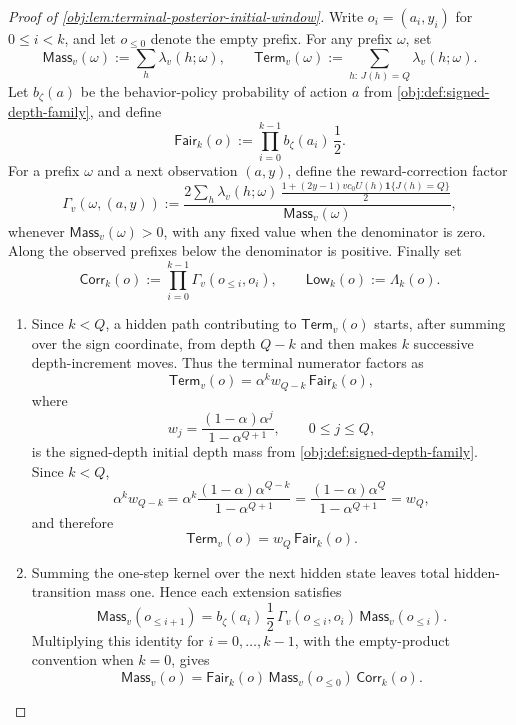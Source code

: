 \begin{proof}[Proof of \cref{obj:lem:terminal-posterior-initial-window}]
Write \(o_i=(a_i,y_i)\) for \(0\le i<k\), and let \(o_{\le 0}\) denote the empty prefix.  For any prefix \(\omega\), set
\[
\mathsf{Mass}_v(\omega):=\sum_h \lambda_v(h;\omega),
\qquad
\mathsf{Term}_v(\omega):=\sum_{h:\,J(h)=Q}\lambda_v(h;\omega).
\]
Let \(b_\zeta(a)\) be the behavior-policy probability of action \(a\) from \cref{obj:def:signed-depth-family}, and define
\[
\mathsf{Fair}_k(o)
:=
\prod_{i=0}^{k-1} b_\zeta(a_i)\,\frac12 .
\]
For a prefix \(\omega\) and a next observation \((a,y)\), define the reward-correction factor
\[
\Gamma_v(\omega,(a,y))
:=
\frac{
  2\sum_h \lambda_v(h;\omega)\,
  \frac{1+(2y-1)v c_0 U(h)\mathbf 1\{J(h)=Q\}}{2}
}{
  \mathsf{Mass}_v(\omega)
},
\]
whenever \(\mathsf{Mass}_v(\omega)>0\), with any fixed value when the denominator is zero.  Along the observed prefixes below the denominator is positive.  Finally set
\[
\mathsf{Corr}_k(o):=\prod_{i=0}^{k-1}\Gamma_v(o_{\le i},o_i),
\qquad
\mathsf{Low}_k(o):=\Lambda_k(o).
\]

\begin{enumerate}
\item Since \(k<Q\), a hidden path contributing to \(\mathsf{Term}_v(o)\) starts, after summing over the sign coordinate, from depth \(Q-k\) and then makes \(k\) successive depth-increment moves.  Thus the terminal numerator factors as
\[
\mathsf{Term}_v(o)
=
\alpha^k w_{Q-k}\,\mathsf{Fair}_k(o),
\]
where
\[
w_j=\frac{(1-\alpha)\alpha^j}{1-\alpha^{Q+1}},
\qquad 0\le j\le Q,
\]
is the signed-depth initial depth mass from \cref{obj:def:signed-depth-family}.  Since \(k<Q\),
\[
\alpha^k w_{Q-k}
=
\alpha^k\frac{(1-\alpha)\alpha^{Q-k}}{1-\alpha^{Q+1}}
=
\frac{(1-\alpha)\alpha^Q}{1-\alpha^{Q+1}}
=
w_Q,
\]
and therefore
\[
\mathsf{Term}_v(o)=w_Q\,\mathsf{Fair}_k(o).
\]

\item Summing the one-step kernel over the next hidden state leaves total hidden-transition mass one.  Hence each extension satisfies
\[
\mathsf{Mass}_v(o_{\le i+1})
=
b_\zeta(a_i)\,\frac12\,
\Gamma_v(o_{\le i},o_i)\,
\mathsf{Mass}_v(o_{\le i}).
\]
Multiplying this identity for \(i=0,\ldots,k-1\), with the empty-product convention when \(k=0\), gives
\[
\mathsf{Mass}_v(o)
=
\mathsf{Fair}_k(o)\,
\mathsf{Mass}_v(o_{\le 0})\,
\mathsf{Corr}_k(o).
\]


\end{enumerate}
\end{proof}
